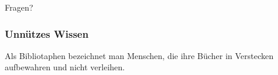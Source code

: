 \documentclass{beamer}
\begin{document}
\begin{frame}
	\begin{center}
		Fragen?
	\end{center}
\end{frame}

\begin{frame}
	\frametitle{Unnützes Wissen}
	\begin{center}
		Als Bibliotaphen  bezeichnet man Menschen, die ihre Bücher in 		Verstecken aufbewahren und nicht verleihen.
	\end{center}
\end{frame}
\end{document}
